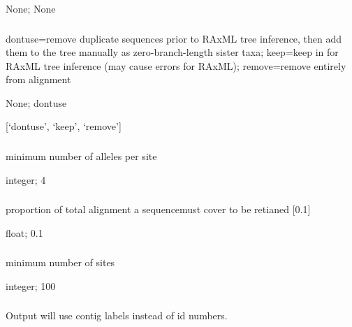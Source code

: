 \documentclass[letterpaper,11pt,english]{sphinxmanual}
\begin{document}
 None;  None


\subsubsection{}
\label{\detokenize{prog_desc:duplicate-seq-duplicateseq}}
 dontuse=remove duplicate sequences prior to RAxML tree inference, then add them to the tree manually as zero-branch-length sister taxa; keep=keep in for RAxML tree inference (may cause errors for RAxML); remove=remove entirely from alignment

 None;  dontuse

 {[}‘dontuse’, ‘keep’, ‘remove’{]}


\subsubsection{}
\label{\detokenize{prog_desc:mindepth}}
 minimum number of alleles per site

 integer;  4


\subsubsection{}
\label{\detokenize{prog_desc:minseqcoverage}}
 proportion of total alignment a sequencemust cover to be retianed {[}0.1{]}

 float;  0.1


\subsubsection{}
\label{\detokenize{prog_desc:minsites}}
 minimum number of sites

 integer;  100


\subsubsection{}
\label{\detokenize{prog_desc:output-contig-labels-outputcontiglabels}}
 Output will use contig labels instead of id numbers.
\end{document}
